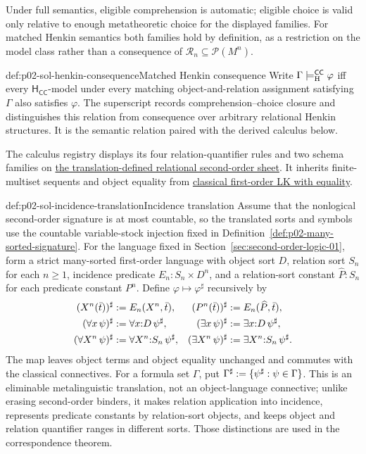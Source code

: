 Under full semantics, eligible comprehension is automatic; eligible choice is
valid only relative to enough metatheoretic choice for the displayed families.
For matched Henkin semantics both families hold by definition, as a restriction
on the model class rather than a consequence of
\(\mathcal R_n\subseteq\mathcal P(M^n)\).

\begin{hbdefinition}{def:p02-sol-henkin-consequence}{Matched Henkin consequence}
Write \(\Gamma\models_{\mathrm H}^{\mathsf{CC}}\varphi\) iff every
\(\mathsf H_{\mathsf{CC}}\)-model under every matching object-and-relation
assignment satisfying \(\Gamma\) also satisfies \(\varphi\).  The superscript
records comprehension--choice closure and distinguishes this relation from
consequence over arbitrary relational Henkin structures.  It is the semantic
relation paired with the derived calculus below.
\end{hbdefinition}

The calculus registry displays its four relation-quantifier rules and two
schema families on \hyperref[sheet:sol]{the translation-defined relational
second-order sheet}.  It inherits finite-multiset sequents and object equality
from \hyperref[sheet:lk-eq]{classical first-order LK with equality}.

\begin{hbdefinition}{def:p02-sol-incidence-translation}{Incidence translation}
Assume that the nonlogical second-order signature is at most countable, so the
translated sorts and symbols use the countable variable-stock injection fixed
in Definition~\ref{def:p02-many-sorted-signature}.  For the language fixed in
Section~\ref{sec:second-order-logic-01}, form a strict
many-sorted first-order language with object sort \(D\), relation sort \(S_n\)
for each \(n\geq1\), incidence predicate \(E_n:S_n\times D^n\), and a
relation-sort constant \(\widehat P:S_n\) for each predicate constant \(P^n\).
Define \(\varphi\mapsto\varphi^\sharp\) recursively by
\[
\begin{aligned}
 (X^n(\bar t))^\sharp&\mathrel{:=} E_n(X^n,\bar t),
 & (P^n(\bar t))^\sharp&\mathrel{:=} E_n(\widehat P,\bar t),\\
 (\forall x\,\psi)^\sharp&\mathrel{:=}\forall x{:}D\,\psi^\sharp,
 & (\exists x\,\psi)^\sharp&\mathrel{:=}\exists x{:}D\,\psi^\sharp,\\
 (\forall X^n\,\psi)^\sharp&\mathrel{:=}\forall X^n{:}S_n\,\psi^\sharp,
 & (\exists X^n\,\psi)^\sharp&\mathrel{:=}\exists X^n{:}S_n\,\psi^\sharp.
\end{aligned}
\]
The map leaves object terms and object equality unchanged and commutes with
the classical connectives.  For a formula set \(\Gamma\), put
\(\Gamma^\sharp\mathrel{:=}\{\psi^\sharp:\psi\in\Gamma\}\).  This is an eliminable
metalinguistic translation, not an object-language connective; unlike erasing
second-order binders, it makes relation application into incidence, represents
predicate constants by relation-sort objects, and keeps object and relation
quantifier ranges in different sorts.  Those distinctions are used in the
correspondence theorem.
\end{hbdefinition}

